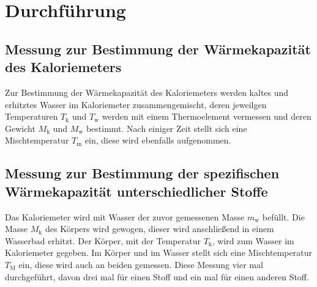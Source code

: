 \section{Durchführung}
\label{sec:Durchführung}
\subsection{Messung zur Bestimmung der Wärmekapazität des Kaloriemeters}
Zur Bestimmung der Wärmekapazität des Kaloriemeters werden kaltes und erhitztes
Wasser im Kaloriemeter zusammengemischt, deren jeweilgen Temperaturen
$T_{\mathrm{k}}$ und $T_{\mathrm{w}}$ werden mit einem
Thermoelement vermessen und deren Gewicht $M_{\mathrm{k}}$ und $M_{\mathrm{w}}$
bestimmt. Nach einiger Zeit stellt sich eine Mischtemperatur $T_{\mathrm{m}}$
ein, diese wird ebenfalls aufgenommen.

\subsection{Messung zur Bestimmung der spezifischen Wärmekapazität unterschiedlicher Stoffe}
Das Kaloriemeter wird mit Wasser der zuvor gemessenen Masse $m_{\mathrm{w}}$ befüllt.
Die Masse $M_\mathrm{k}$ des Körpers wird gewogen, dieser wird anschließend in einem
Wasserbad erhitzt. Der Körper, mit der Temperatur $T_{\mathrm{k}}$, wird zum Wasser
im Kaloriemeter gegeben. Im Körper und im Wasser stellt sich eine Mischtemperatur
$T_{\mathrm{M}}$ ein, diese wird auch an beiden gemessen.
Diese Messung vier mal durchgeführt, davon drei mal für einen Stoff und ein mal für einen
anderen Stoff.
